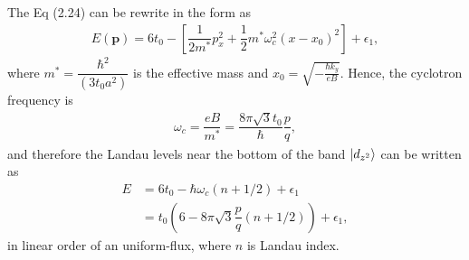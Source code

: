 \documentclass{report}
\newcommand{\f}[2]{\dfrac{#1}{#2}}
\begin{document}
The Eq (2.24) can be rewrite in the form as
\begin{gather}
	E(\mathbf{p}) = 6 t_{0} - \left[\f{1}{2m^{*}} p_{x}^{2} + \f{1}{2} m^{*} \omega_{c}^{2}(x - x_{0})^{2}\right] + \epsilon_{1},
\end{gather}
where $m^{*} = \f{\hbar^{2}}{(3t_{0}a^{2}) }$ is the effective mass and $x_{0} = \sqrt{-\frac{\hbar k_{y}}{eB}}$. Hence, the cyclotron frequency is
\begin{gather}
	\omega_{c} = \f{eB}{m^{*}} = \f{8 \pi \sqrt{3} t_{0}}{\hbar}  \f{p}{q},
\end{gather}
and therefore the Landau levels near the bottom of the band $\ket{d_{z^{2}}}$ can be written as
\begin{equation}
	\begin{aligned}
		E
		 & = 6 t_{0} - \hbar \omega_{c} (n + 1 /2) + \epsilon_{1}                    \\
		 & = t_{0} \left(6 - 8\pi\sqrt{3} \f{p}{q}( n + 1 /2)\right) + \epsilon_{1},
	\end{aligned}
\end{equation}
in linear order of an uniform-flux, where $n$ is Landau index.
\end{document}
